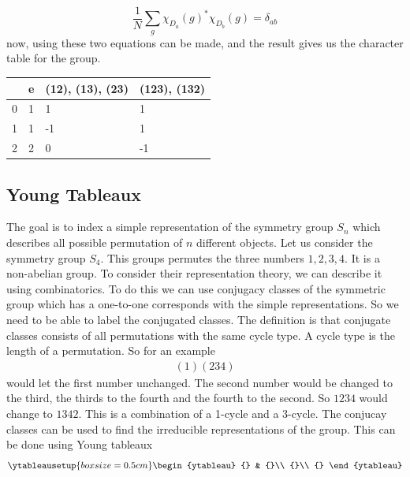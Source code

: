 \begin{equation}
    \frac{1}{N}\sum_g \chi_{D_a}(g)^*\chi_{D_b}(g)=\delta_{ab}
\end{equation}
now, using these two equations can be made, and the result gives us the character table for the group.
\begin{table}[]
\begin{tabular}{l|lll}
  & e & (12), (13), (23) & (123), (132) \\ \hline
0 & 1 & 1                & 1            \\
1 & 1 & -1               & 1            \\
2 & 2 & 0                & -1          
\end{tabular}
\end{table}

\subsection{Young Tableaux} \label{sec:youngtab}
The goal is to index a simple representation of the symmetry group $S_n$ which describes all possible permutation of $n$ different objects. Let us consider the symmetry group $S_4$. This groups permutes the three numbers $1,2,3,4$. It is a non-abelian group. To consider their representation theory, we can describe it using combinatorics. To do this we can use conjugacy classes of the symmetric group which has a one-to-one corresponds with the simple representations. So we need to be able to label the conjugated classes. The definition is that conjugate classes consists of all permutations with the same cycle type. A cycle type is the length of a permutation. So for an example
\begin{align*}
    (1)(234)
    \label{eq:cycle}
\end{align*}
would let the first number unchanged. The second number would be changed to the third, the thirds to the fourth and the fourth to the second. So $1234$ would change to $1342$. This is a combination of a 1-cycle and a 3-cycle. The conjucay classes can be used to find the irreducible representations of the group. This can be done using Young tableaux \cite{Georgi1999}
\begin{align}
    \ytableausetup{boxsize=0.5cm}
    \begin{ytableau}
        {} & {}\\
        {}\\
        {}
    \end{ytableau}
\end{align}

